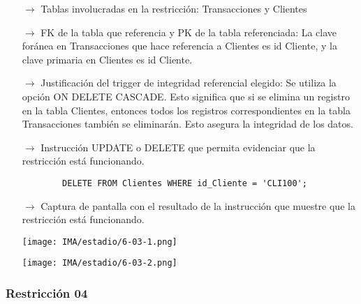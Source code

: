 \begin{itemize}
    \item[$\rightarrow$] Tablas involucradas en la restricción: Transacciones y Clientes
    \item[$\rightarrow$] FK de la tabla que referencia y PK de la tabla referenciada: La clave foránea en Transacciones que hace referencia a Clientes es id Cliente, y la clave primaria en Clientes es id Cliente.
    \item[$\rightarrow$] Justificación del trigger de integridad referencial elegido:  Se utiliza la opción ON DELETE CASCADE. Esto significa que si se elimina un registro en la tabla Clientes, entonces todos los registros correspondientes en la tabla Transacciones también se eliminarán. Esto asegura la integridad de los datos. 
    \item[$\rightarrow$] Instrucción UPDATE o DELETE que permita evidenciar que la restricción está
    funcionando.
    \begin{verbatim}
        DELETE FROM Clientes WHERE id_Cliente = 'CLI100';
    \end{verbatim}
    \item[$\rightarrow$] Captura de pantalla con el resultado de la instrucción que muestre que la restricción está
    funcionando.
    \begin{center}
        \texttt{[image: IMA/estadio/6-03-1.png]}

        \texttt{[image: IMA/estadio/6-03-2.png]}
    \end{center}
\end{itemize}


\subsubsection*{Restricción 04}

